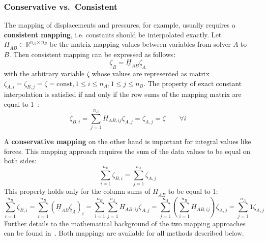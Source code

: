   \subsubsection{Conservative vs.\ Consistent}\label{sec:Coupl-DataMapping-conVScon}
   The mapping of displacements and pressures, for example, usually requires a \textbf{consistent mapping}, i.e. constants should be interpolated exactly. Let $\underline{H}_{AB} \in \mathbb{R}^{n_A \times n_B}$ be the matrix mapping values between variables from solver $A$ to $B$. Then consistent mapping can be expressed as follows:
   \begin{equation}
   \underline{\zeta}_B = \underline{H}_{AB} \underline{\zeta}_A
   \end{equation}
   with the arbitrary variable $\zeta$ whose values are represented as matrix $\zeta_{A,i} = \zeta_{B,j} = \zeta = \text{const}, 1 \leq i \leq n_A, 1 \leq j \leq n_B$. The property of exact constant interpolation is satisfied if and only if the row sums of the mapping matrix are equal to 1~\cite{gatzhammer2015efficient}:
   \begin{equation}
   \zeta_{B,i} = \sum_{j=1}^{n_A} H_{AB,ij}\zeta_{A,j} = \zeta_{A,j} = \zeta \qquad \forall i
   \end{equation}
   
   A \textbf{conservative mapping} on the other hand is important for integral values like forces. This mapping approach requires the sum of the data values to be equal on both sides:
   \begin{equation}
   \sum_{i=1}^{n_B}\zeta_{B,i} = \sum_{j=1}^{n_A}\zeta_{A,j}
   \end{equation}
   This property holds only for the column sums of $\underline{H}_{AB}$ to be equal to 1:
   \begin{equation}
   \sum_{i=1}^{n_B}\zeta_{B,i} = \sum_{i=1}^{n_B}\left( \underline{H}_{AB}\underline{\zeta}_A \right)_i = \sum_{i=1}^{n_B}\sum_{j=1}^{n_A} H_{AB,ij}\zeta_{A,j} = \sum_{j=1}^{n_A}\left( \sum_{i=1}^{n_B} H_{AB,ij}\right) \zeta_{A,j} = \sum_{j=1}^{n_A} 1 \zeta_{A,j}
   \end{equation}
   Further details to the mathematical background of the two mapping approaches can be found in~\cite{gatzhammer2015efficient}. Both mappings are available for all methods described below.

